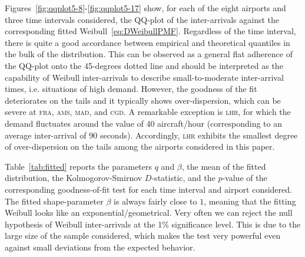 \documentclass[final,review]{elsarticle}
\makeatletter
\newcommand*{\ie}{i.e.\@\xspace}
\newcommand{\airp}[1]{\textcolor{#1}{\textsc{#1}}}
\makeatother
\begin{document}
Figures~\ref{fig:qqplot5-8}-\ref{fig:qqplot5-17} show, for each of the eight airports and three time intervals considered, the QQ-plot of the inter-arrivals against the corresponding fitted Weibull~\eqref{eq:DWeibullPMF}.
Regardless of the time interval, there is quite a good accordance between empirical and theoretical quantiles in the bulk of the distribution.
This can be observed as a general flat adherence of the QQ-plot onto the 45-degrees dotted line and should be interpreted as the capability of Weibull inter-arrivals to describe small-to-moderate inter-arrival times, \ie{} situations of high demand.
However, the goodness of the fit deteriorates on the tails and it typically shows over-dispersion, which can be severe at \airp{fra}, \airp{ams}, \airp{mad}, and \airp{cgd}.
A remarkable exception is \airp{lhr}, for which the demand fluctuates around the value of 40 aircraft/hour (corresponding to an average inter-arrival of 90 seconds).
Accordingly, \airp{lhr} exhibits the smallest degree of over-dispersion on the tails among the airports considered in this paper.

Table~\ref{tab:fitted} reports the parameters \(q\) and \(\beta\), the mean of the fitted distribution, the Kolmogorov-Smirnov \(D\)-statistic, and the \(p\)-value of the corresponding goodness-of-fit test for each time interval and airport considered.
The fitted shape-parameter \(\beta\) is always fairly close to \(1\), meaning that the fitting Weibull looks like an exponential/geometrical.
Very often we can reject the null hypothesis of Weibull inter-arrivals at the 1\% significance level.
This is due to the large size of the sample considered, which makes the test very powerful even against small deviations from the expected behavior.
\end{document}
